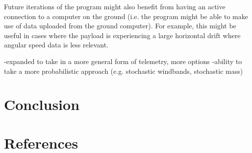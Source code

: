 \documentclass[11pt]{article}
\begin{document}
Future iterations of the program might also benefit from having an active connection to a computer on the ground (i.e. the program might be able to make use of data uploaded from the ground computer). For example, this might be useful in cases where the payload is experiencing a large horizontal drift where angular speed data is less relevant. 

-expanded to take in a more general form of telemetry, more options
-ability to take a more probabilistic approach (e.g. stochastic windbands, stochastic mass)

\section{Conclusion}

\section{References}
\end{document}
